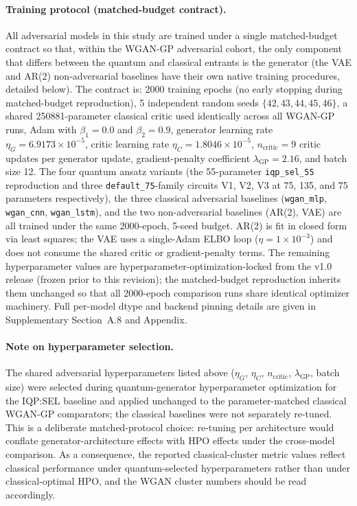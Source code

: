 \documentclass[12pt,twocolumn]{article}
\begin{document}
\paragraph{Training protocol (matched-budget contract).}
All adversarial models in this study are trained under a single matched-budget
contract so that, within the WGAN-GP adversarial cohort, the only component
that differs between the quantum and classical entrants is the generator
(the VAE and AR(2) non-adversarial baselines have their own native
training procedures, detailed below). The contract is: 2000 training epochs
(no early stopping during matched-budget reproduction), 5 independent random
seeds $\{42, 43, 44, 45, 46\}$, a shared 250881-parameter classical critic
used identically across all WGAN-GP runs, Adam with $\beta_1 = 0.0$ and
$\beta_2 = 0.9$, generator learning rate $\eta_G = 6.9173 \times 10^{-5}$,
critic learning rate $\eta_C = 1.8046 \times 10^{-5}$, $n_\text{critic} = 9$
critic updates per generator update, gradient-penalty coefficient
$\lambda_\text{GP} = 2.16$, and batch size 12. The four quantum ansatz
variants (the 55-parameter \texttt{iqp\_sel\_55} reproduction and three
\texttt{default\_75}-family circuits V1, V2, V3 at 75, 135, and 75 parameters
respectively), the three classical adversarial baselines (\texttt{wgan\_mlp},
\texttt{wgan\_cnn}, \texttt{wgan\_lstm}), and the two non-adversarial
baselines (AR(2), VAE) are all trained under the same 2000-epoch, 5-seed
budget. AR(2) is fit in closed form via least squares; the VAE uses a
single-Adam ELBO loop ($\eta = 1 \times 10^{-3}$) and does not consume the
shared critic or gradient-penalty terms. The remaining hyperparameter values
are hyperparameter-optimization-locked from the v1.0 release (frozen prior to
this revision); the matched-budget reproduction inherits them unchanged so
that all 2000-epoch comparison runs share identical optimizer machinery.
Full per-model dtype and backend pinning details are given in
Supplementary Section~A.8 and Appendix.

\paragraph{Note on hyperparameter selection.}
The shared adversarial hyperparameters listed above ($\eta_G$, $\eta_C$,
$n_\text{critic}$, $\lambda_\text{GP}$, batch size) were selected during
quantum-generator hyperparameter optimization for the IQP:SEL baseline and
applied unchanged to the parameter-matched classical WGAN-GP comparators;
the classical baselines were not separately re-tuned. This is a deliberate
matched-protocol choice: re-tuning per architecture would conflate
generator-architecture effects with HPO effects under the cross-model
comparison. As a consequence, the reported classical-cluster metric values
reflect classical performance under quantum-selected hyperparameters rather
than under classical-optimal HPO, and the WGAN cluster numbers should be
read accordingly.
\end{document}
